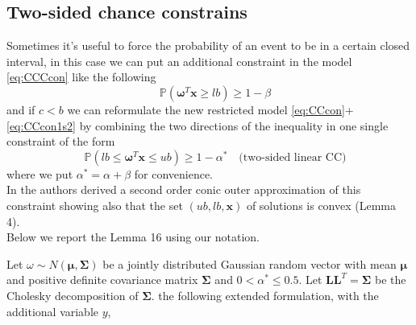 \subsection{Two-sided chance constrains}
Sometimes it's useful to force the probability of an event to be in a certain closed interval, in this case we can put an additional constraint in the model \eqref{eq:CCCcon} like the following
 	\begin{equation}\label{eq:CCcon1s2}
	\quad \mathbb{P}(\boldsymbol{\omega}^{T}\boldsymbol{x} \geq lb)\geq 1-\beta 
	\end{equation}
and if $c < b$ we can reformulate the new restricted model  \eqref{eq:CCcon}+\eqref{eq:CCcon1s2} by combining the two directions of the inequality in one single constraint of the form
 	\begin{equation}\label{eq:CCcon2s}
 \quad \mathbb{P}(lb \leq \boldsymbol{\omega}^{T}\boldsymbol{x} \leq ub)\geq 1-\alpha^* \quad{\text{(two-sided linear CC)}}
 \end{equation}
 where we put $\alpha^*=\alpha+\beta$ for convenience. \\
 In \cite{Lubin et al. two.sided linear con...} the authors derived a second order conic outer approximation of this constraint showing also that the set $(ub,lb,\boldsymbol{x})$ of solutions is convex (Lemma 4). \\
 Below we report the Lemma 16 using our notation.
 \par Let $\omega \sim N(\boldsymbol{\mu}, \boldsymbol{\Sigma})$ be a jointly distributed Gaussian random vector with mean $\boldsymbol{\mu}$ and positive definite covariance matrix $\boldsymbol{\Sigma}$ and $0 < \alpha^* \leq 0.5$. Let $\boldsymbol{L}\boldsymbol{L}^T=\boldsymbol{\Sigma}$ be the Cholesky decomposition of $\boldsymbol{\Sigma}$. the following extended formulation, with the additional variable $y$,
 
